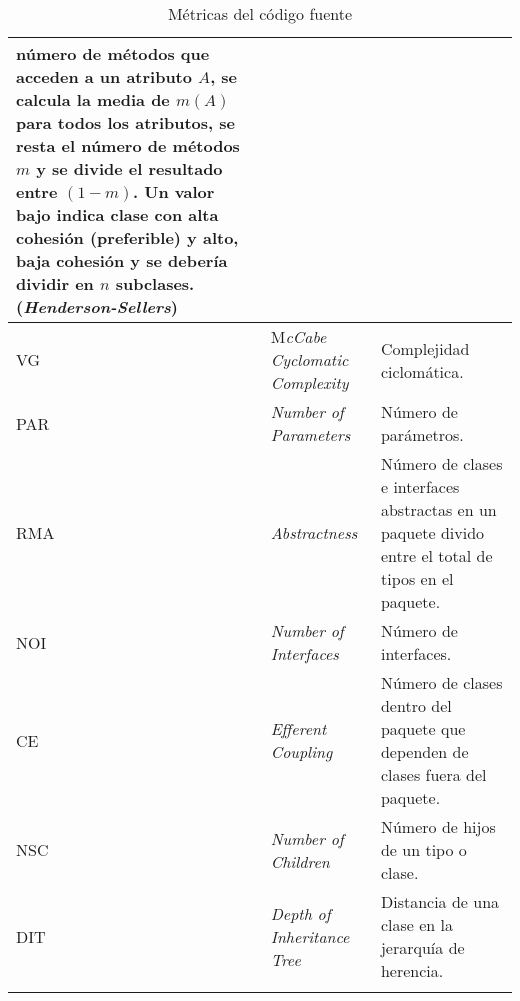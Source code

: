 \begin{longtable}{|p{2cm}|p{3cm}|p{8cm}|}
			número de métodos que acceden a un atributo $A$, se calcula la media de $m(A)$ para
			 todos los atributos, se resta el número de métodos $m$ y se divide el resultado
			 entre $(1-m)$. Un valor bajo indica clase con alta cohesión (preferible) y alto, baja
			 cohesión y se debería dividir en $n$ subclases. (\textit{Henderson-Sellers})\\ \hline
			VG&M\textit{cCabe Cyclomatic Complexity} &Complejidad ciclomática.\\ \hline
			PAR&\textit{Number of Parameters} & Número de parámetros.\\ \hline
			RMA&\textit{Abstractness}& Número de clases e interfaces abstractas en un paquete divido
			entre el total de tipos en el paquete.\\ \hline 
			NOI&\textit{Number of Interfaces}&Número de interfaces.\\ \hline
			CE&\textit{Efferent Coupling}& Número de clases dentro del paquete que dependen de
			clases fuera del paquete.\\ \hline 
			NSC&\textit{Number of Children}& Número de hijos de un tipo o clase.\\ \hline
			DIT&\textit{Depth of Inheritance Tree}&Distancia de una clase en la jerarquía de herencia.\\
			\hline \hline
        \caption{Métricas del código fuente} \label{tabla:metricas}
        \end{longtable}      
        
